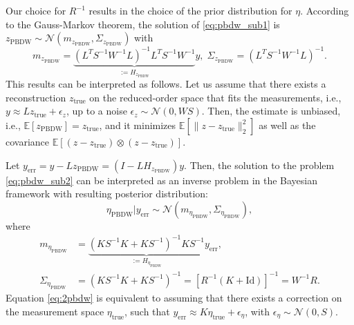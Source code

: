 \begin{rmk}
 Our choice for $R^{-1}$ results in the choice of the prior distribution for $\eta$. According to the Gauss-Markov theorem, the solution of \eqref{eq:pbdw_sub1} is 
 $z_{\text{PBDW}}\sim\mathcal{N}(m_{z_{\text{PBDW}}}, \Sigma_{z_{\text{PBDW}}})$ with
 \begin{equation}
       \label{eq:1pbdw}
       m_{z_{\text{PBDW}}}=\underbrace{(L^T S^{-1}W^{-1} L)^{-1} L^T S^{-1}W^{-1}}_{:=H_{z_{\text{PBDW}}}} y,\;
       \Sigma_{z_{\text{PBDW}}}=(L^T S^{-1}W^{-1} L)^{-1}.
   \end{equation} 
       This results can be interpreted as follows. Let us assume that there exists a reconstruction $z_{\text{true}}$ on the reduced-order space that fits the measurements, i.e.,  
       $y\approx Lz_{\text{true}}+\epsilon_{z}$, up to a noise $\epsilon_{z}\sim\mathcal{N}(0, WS)$. Then, the estimate is unbiased, i.e.,
        $\mathbb{E}[z_{\text{PBDW}}]=z_{\text{true}}$, and it minimizes $\mathbb{E}[\lVert z-z_{\text{true}}\rVert^2_2]$ as well as the covariance $\mathbb{E}[(z-z_{\text{true}})\otimes(z-z_{\text{true}})]$.
 
 Let $y_{\text{err}}=y-Lz_{\text{PBDW}}=(I-LH_{z_{\text{PBDW}}})y$. Then, the solution to the problem \eqref{eq:pbdw_sub2} 
 can be interpreted as an inverse problem in the Bayesian framework with resulting posterior distribution:
 $$
 \eta_{\text{PBDW}}|y_{\text{err}}\sim\mathcal{N}(m_{\eta_{\text{PBDW}}}, \Sigma_{\eta_{\text{PBDW}}}),
 $$ 
 where
 \begin{equation}\label{eq:2pbdw}
 \begin{aligned}
 m_{\eta_{\text{PBDW}}} & = \underbrace{(KS^{-1}K+KS^{-1})^{-1}KS^{-1}}_{:= H_{\eta_{\text{PBDW}}}}y_{\text{err}},\\
 \Sigma_{\eta_{\text{PBDW}}} & =(KS^{-1}K+KS^{-1})^{-1} = \left[R^{-1}\left(K + \text{Id}\right)\right]^{-1} = W^{-1} R.
 \end{aligned}
 \end{equation}
 Equation \eqref{eq:2pbdw} is equivalent to assuming that there exists a correction on the measurement space 
 $\eta_{\text{true}}$, such that $y_{\text{err}}\approx K\eta_{\text{true}}+\epsilon_{\eta}$, with $\epsilon_{\eta}\sim\mathcal{N}(0, S)$.
 

\end{rmk}
